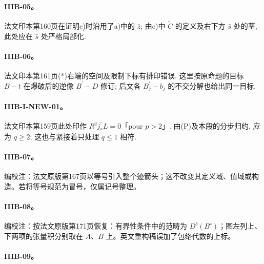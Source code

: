 \hypertarget{collation-IIIB-05}{}

\paragraph*{IIIB-05。}

法文印本第160页在证明c)时沿用了a)中的 $\bar z$; 由c)中 $\widetilde C$ 的定义及右下方 $\bar s$ 处的茎, 此处应在 $\bar s$ 处严格局部化.

\hypertarget{collation-IIIB-06}{}

\paragraph*{IIIB-06。}

法文印本第161页(*)右端的空间及限制下标有排印错误. 这里按原命题的目标 $B-t$ 在爆破后的逆像 $B^\prime-D$ 修订; 后文各 $B^\prime_j-b_j$ 的不交分解也给出同一目标.

\hypertarget{collation-IIIB-I-NEW-01}{}

\paragraph*{IIIB-I-NEW-01。}

法文印本第159页此处印作 $R^qj^\prime_*L=0$「pour $p>2$」. 由(P)及本段的分步归约, 应为 $q\ge2$; 这也与紧接着只处理 $q\le1$ 相符.

\hypertarget{collation-IIIB-07}{}

\paragraph*{IIIB-07。}

编校注：法文原版第167页以等号引入整个迹箭头；这不改变其定义域、值域或构造。若将等号规范为冒号，仅属记号整理。

\hypertarget{collation-IIIB-08}{}

\paragraph*{IIIB-08。}

编校注：按法文原版第171页恢复：有界性条件中的范畴为 $D^b(B^\circ)$；图左列上、下两项的张量积分别取在 $A$、$B$ 上。英文重构稿误加了包络代数的上标。

\hypertarget{collation-IIIB-09}{}

\paragraph*{IIIB-09。}

